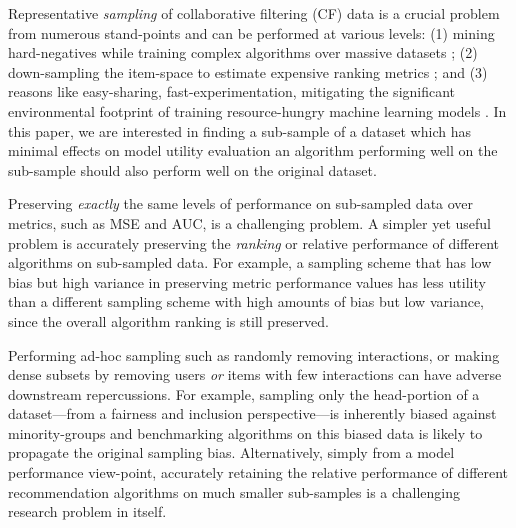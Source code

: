 Representative \emph{sampling} of collaborative filtering (CF) data is a crucial problem from numerous stand-points and can be performed at various levels: (1) mining hard-negatives while training complex algorithms over massive datasets \cite{eclare, sampling_cf_nn}; (2) down-sampling the item-space to estimate expensive ranking metrics \cite{sampled_metrics, castells_sampling}; and (3) 
reasons like easy-sharing, fast-experimentation, mitigating the significant environmental footprint of training resource-hungry machine learning models \cite{google_emissions, wu2021sustainable, facebook_emissions, green_ai}. In this paper, we are interested in finding a sub-sample of a dataset which has minimal effects on model utility evaluation \ie an algorithm performing well on the sub-sample should also perform well on the original dataset.

Preserving \emph{exactly} the same levels of performance on sub-sampled data over metrics, such as MSE and AUC, is a challenging problem. A simpler yet useful problem is accurately preserving the \emph{ranking} or relative performance of different algorithms on sub-sampled data. For example, a sampling scheme that has low bias but high variance in preserving metric performance values has less utility than a different sampling scheme with high amounts of bias but low variance, since the overall algorithm ranking is still preserved. 

Performing 
ad-hoc sampling such as randomly removing interactions, or making dense subsets by removing users \emph{or} items with few interactions \cite{sigir20} can have adverse downstream repercussions. For example, sampling only the head-portion of a dataset---from a fairness and inclusion perspective---is inherently biased against minority-groups and benchmarking algorithms on this biased data is 
likely to propagate the 
original sampling bias.
Alternatively,
simply from 
a model performance view-point,
accurately retaining the relative performance of different recommendation algorithms on much smaller sub-samples is a challenging research problem in itself.

